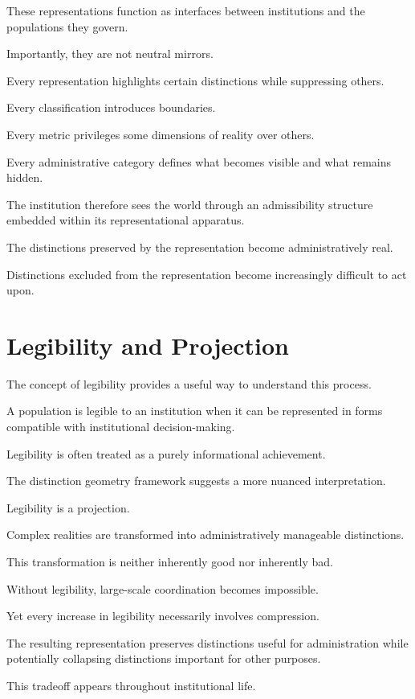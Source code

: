 \documentclass[11pt,oneside,openany]{book}
\begin{document}
These representations function as interfaces between institutions and the populations they govern.

Importantly, they are not neutral mirrors.

Every representation highlights certain distinctions while suppressing others.

Every classification introduces boundaries.

Every metric privileges some dimensions of reality over others.

Every administrative category defines what becomes visible and what remains hidden.

The institution therefore sees the world through an admissibility structure embedded within its representational apparatus.

The distinctions preserved by the representation become administratively real.

Distinctions excluded from the representation become increasingly difficult to act upon.

\section{Legibility and Projection}

The concept of legibility provides a useful way to understand this process.

A population is legible to an institution when it can be represented in forms compatible with institutional decision-making.

Legibility is often treated as a purely informational achievement.

The distinction geometry framework suggests a more nuanced interpretation.

Legibility is a projection.

Complex realities are transformed into administratively manageable distinctions.

This transformation is neither inherently good nor inherently bad.

Without legibility, large-scale coordination becomes impossible.

Yet every increase in legibility necessarily involves compression.

The resulting representation preserves distinctions useful for administration while potentially collapsing distinctions important for other purposes.

This tradeoff appears throughout institutional life.
\end{document}
